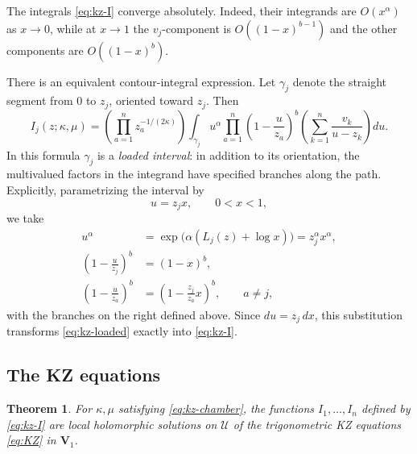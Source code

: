 \documentclass[12pt]{amsart}
\newtheorem{thm}{Theorem}[section]
\theoremstyle{definition}
\numberwithin{equation}{section}
\theoremstyle{definition}
\let\mc\mathcal
\let\ka\kappa
\def\beq{\begin{equation}}
\def\eeq{\end{equation}}
\begin{document}
The integrals \eqref{eq:kz-I} converge absolutely.
Indeed, their integrands are $O(x^\alpha)$ as $x\to0$,
while at $x\to1$ the $v_j$-component is
$O((1-x)^{b-1})$ and the other components are
$O((1-x)^b)$.

There is an equivalent contour-integral expression.
Let $\gamma_j$ denote the straight segment from $0$ to $z_j$,
oriented toward $z_j$.  Then
\beq\label{eq:kz-loaded}
 I_j(z;\ka,\mu)=
 \left(\prod_{a=1}^n z_a^{-1/(2\ka)}\right)
 \int_{\gamma_j}
 u^\alpha\prod_{a=1}^n
 \left(1-\frac{u}{z_a}\right)^b
 \left(\sum_{k=1}^n\frac{v_k}{u-z_k}\right)du.
\eeq
In this formula $\gamma_j$ is a \emph{loaded interval}:
in addition to its orientation, the multivalued factors
in the integrand have specified branches along the path.
Explicitly, parametrizing the interval by
\[
 u=z_jx,\qquad 0<x<1,
\]
we take
\[
 \begin{aligned}
 u^\alpha
 &=\exp\bigl(\alpha(L_j(z)+\log x)\bigr)
   =z_j^\alpha x^\alpha,\\
 \left(1-\frac{u}{z_j}\right)^b&=(1-x)^b,\\
 \left(1-\frac{u}{z_a}\right)^b
 &=\left(1-\frac{z_j}{z_a}x\right)^b,
 \qquad a\ne j,
 \end{aligned}
\]
with the branches on the right defined above.
Since $du=z_j\,dx$, this substitution transforms
\eqref{eq:kz-loaded} exactly into \eqref{eq:kz-I}.

\subsection{The KZ equations}

\begin{thm}\label{thm:kz-integrals}
For $\ka,\mu$ satisfying \eqref{eq:kz-chamber}, the functions
$I_1,\ldots,I_n$ defined by \eqref{eq:kz-I} are local holomorphic
solutions on $\mc U$ of the trigonometric KZ equations
\eqref{eq:KZ} in $\mathbf V_1$.
\end{thm}
\end{document}
